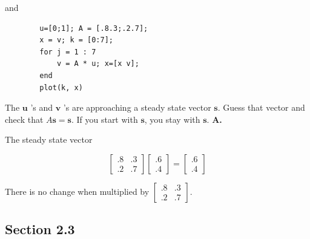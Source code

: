 \documentclass[main.tex]{subfiles}
\begin{document}
\begin{enumerate}
        and
        
        \begin{lstlisting}
        u=[0;1]; A = [.8.3;.2.7];
        x = v; k = [0:7];
        for j = 1 : 7
            v = A * u; x=[x v];
        end
        plot(k, x)
        \end{lstlisting}
        
        The $\boldsymbol{u}$ 's and $\boldsymbol{v}$ 's are approaching a steady state vector $\boldsymbol{s}$. Guess that vector and check that $A \bm{s}=\bm{s}$. If you start with $\bm{s}$, you stay with $\bm{s}$. \textbf{A.}
        
        The steady state vector 
        
        $$
        \left[\begin{array}{ll}
        .8 & .3 \\
        .2 & .7
        \end{array}\right]\left[\begin{array}{l}
        .6 \\
        .4
        \end{array}\right]=\left[\begin{array}{l}
        .6 \\
        .4
        \end{array}\right]
        $$
        
        There is no change when multiplied by $\left[\begin{array}{rr}.8 & .3 \\ .2 & .7\end{array}\right]$.
        
    \end{enumerate}

\subsection{Section 2.3}
\end{document}
